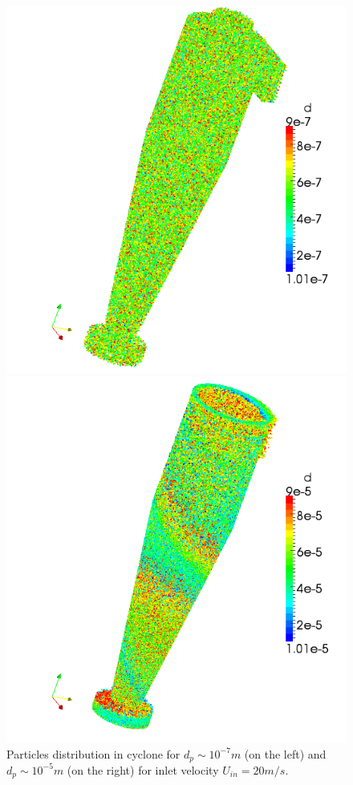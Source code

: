 \documentclass[a4paper]{jpconf}
\begin{document}
	\newpage
\begin{figure}[h]
	\begin{minipage}{0.475\linewidth}
		\includegraphics[scale=0.4]{parcelsCyclone1}
	\end{minipage}
	\hspace{0.5em}
	\begin{minipage}{0.475\linewidth}
		\includegraphics[scale=0.4]{parcelsCyclone3}
	\end{minipage}
	\caption{Particles distribution in cyclone for $d_p \sim 10^{-7}m$ (on the left) and $d_p \sim 10^{-5}m$ (on the right) for inlet velocity $U_{in} = 20m/s$.}
		\label{fig:parcelsCyclone1}
\end{figure}	
\end{document}
